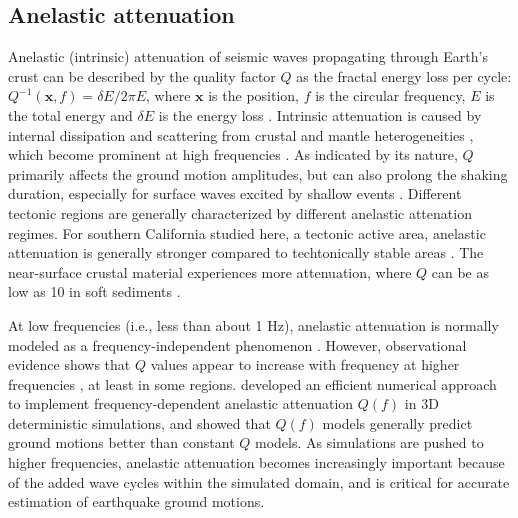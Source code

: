 \subsection{Anelastic attenuation}

Anelastic (intrinsic) attenuation of seismic waves propagating through Earth's crust can be described by the quality factor $Q$ as the fractal energy loss per cycle: $Q^{-1}(\textbf{x}, f) = \delta E / 2\pi E$, where $\textbf{x}$ is the position, $f$ is the circular frequency, $E$ is the total energy and $\delta E$ is the energy loss \citep{oconnellMeasuresDissipationViscoelastic1978}. Intrinsic attenuation is caused by internal dissipation and scattering from crustal and mantle heterogeneities \citep{satoSeismicWavePropagation2009}, which become prominent at high frequencies \citep[$f \geqslant  1$ Hz; e.g., ][]{sato2012seismic}. As indicated by its nature, $Q$ primarily affects the ground motion amplitudes, but can also prolong the shaking duration, especially for surface waves excited by shallow events \citep{imperatoriRoleTopographyLateral2015, laiShallowBasinStructure2020}. Different tectonic regions are generally characterized by different anelastic attenation regimes. For southern California studied here, a tectonic active area, anelastic attenuation is generally stronger compared to techtonically stable areas \citep{frankelAttenuationHighfrequencyShear1990,ericksonFrequencyDependentLgContinental2004}. The near-surface crustal material experiences more attenuation, where $Q$ can be as low as 10 in soft sediments \citep{asterHighfrequencyBoreholeSeismograms1991,abercrombieNearsurfaceAttenuationSite1997}.

At low frequencies (i.e., less than about 1 Hz), anelastic attenuation is normally modeled as a frequency-independent phenomenon \citep{akiQuantitativeSeismology2002}. However, observational evidence shows that $Q$ values appear to increase with frequency at higher frequencies , at least in some regions. \citet{withersMemoryEfficientSimulation2015} developed an efficient numerical approach to implement frequency-dependent anelastic attenuation $Q(f)$ in 3D deterministic simulations, and showed that $Q(f)$ models generally predict ground motions better than constant $Q$ models. As simulations are pushed to higher frequencies, anelastic attenuation becomes increasingly important because of the added wave cycles within the simulated domain, and is critical for accurate estimation of earthquake ground motions.

